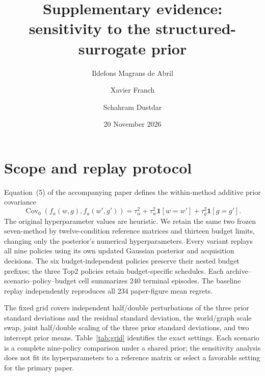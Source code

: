 \documentclass[10pt,a4paper]{article}
\title{\bfseries Supplementary evidence: sensitivity to the structured-surrogate prior}
\author{Ildefons Magrans de Abril \and Xavier Franch \and Schahram Dustdar}
\date{20 November 2026}
\begin{document}
\maketitle

\section*{Scope and replay protocol}
Equation~(5) of the accompanying paper defines the within-method additive prior covariance
\[
\operatorname{Cov}_0(f_a(w,g),f_a(w',g'))=
\tau_\alpha^2+\tau_w^2\mathbf{1}[w=w']+
\tau_g^2\mathbf{1}[g=g'].
\]
The original hyperparameter values are heuristic. We retain the same two frozen
seven-method by twelve-condition reference matrices and thirteen budget limits,
changing only the posterior's numerical hyperparameters. Every variant replays
all nine policies using its own updated Gaussian posterior and acquisition
decisions. The six budget-independent policies preserve their nested budget
prefixes; the three Top2 policies retain budget-specific schedules. Each
archive--scenario--policy--budget cell summarizes 240 terminal episodes.
The baseline replay independently reproduces all 234 paper-figure mean regrets.

The fixed grid covers independent half/double perturbations of the three prior
standard deviations and the residual standard deviation, the world/graph scale
swap, joint half/double scaling of the three prior standard deviations, and two
intercept prior means. Table~\ref{tab:grid} identifies the exact settings.
Each scenario is a complete nine-policy comparison under a shared prior;
the sensitivity analysis does not fit its hyperparameters to a reference
matrix or select a favorable setting for the primary paper.
\end{document}
